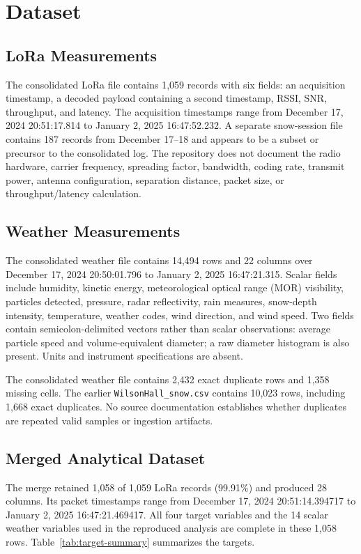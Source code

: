 \section{Dataset}
\subsection{LoRa Measurements}
The consolidated LoRa file contains 1,059 records with six fields: an acquisition timestamp, a decoded payload containing a second timestamp, RSSI, SNR, throughput, and latency. The acquisition timestamps range from December 17, 2024 20:51:17.814 to January 2, 2025 16:47:52.232. A separate snow-session file contains 187 records from December 17--18 and appears to be a subset or precursor to the consolidated log. The repository does not document the radio hardware, carrier frequency, spreading factor, bandwidth, coding rate, transmit power, antenna configuration, separation distance, packet size, or throughput/latency calculation.

\subsection{Weather Measurements}
The consolidated weather file contains 14,494 rows and 22 columns over December 17, 2024 20:50:01.796 to January 2, 2025 16:47:21.315. Scalar fields include humidity, kinetic energy, meteorological optical range (MOR) visibility, particles detected, pressure, radar reflectivity, rain measures, snow-depth intensity, temperature, weather codes, wind direction, and wind speed. Two fields contain semicolon-delimited vectors rather than scalar observations: average particle speed and volume-equivalent diameter; a raw diameter histogram is also present. Units and instrument specifications are absent.

The consolidated weather file contains 2,432 exact duplicate rows and 1,358 missing cells. The earlier \texttt{WilsonHall\_snow.csv} contains 10,023 rows, including 1,668 exact duplicates. No source documentation establishes whether duplicates are repeated valid samples or ingestion artifacts.

\subsection{Merged Analytical Dataset}
The merge retained 1,058 of 1,059 LoRa records (99.91\%) and produced 28 columns. Its packet timestamps range from December 17, 2024 20:51:14.394717 to January 2, 2025 16:47:21.469417. All four target variables and the 14 scalar weather variables used in the reproduced analysis are complete in these 1,058 rows. Table~\ref{tab:target-summary} summarizes the targets.


